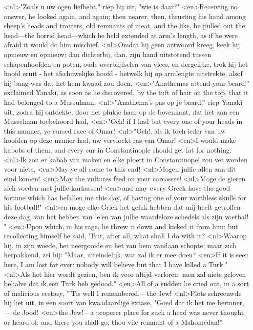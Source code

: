 <nl>"Zoals u uw ogen liefhebt," riep hij uit, "wie is daar?"
<en>Receiving no answer, he looked again, and again; then nearer, then, thrusting his hand among sheep's heads and trotters, old remnants of meat, and the like, he pulled out the head—the horrid head—which he held extended at arm's length, as if he were afraid it would do him mischief.
<nl>Omdat hij geen antwoord kreeg, keek hij opnieuw en opnieuw; dan dichterbij, dan, zijn hand uitstotend tussen schapenhoofden en poten, oude overblijfselen van vlees, en dergelijke, trok hij het hoofd eruit - het afschuwelijke hoofd - hetwelk hij op armlengte uitstrekte, alsof hij bang was dat het hem kwaad zou doen.
<en>"Anathemas attend your beard!" exclaimed Yanaki, as soon as he discovered, by the tuft of hair on the top, that it had belonged to a Mussulman, 
<nl>"Anathema's pas op je baard!" riep Yanaki uit, zodra hij ontdekte, door het plukje haar op de bovenkant, dat het aan een Musselman toebehoord had, 
<en>"Och! if I had but every one of your heads in this manner, ye cursed race of Omar!
<nl>"Och!, als ik toch ieder van uw hoofden op deze manier had, uw vervloekt ras van Omar!
<en>I would make kabobs of them, and every cur in Constantinople should get fat for nothing.
<nl>Ik zou er kabab van maken en elke ploert in Constantinopel zou  vet worden voor niets.
<en>May ye all come to this end!
<nl>Mogen jullie allen  aan dit eind komen!
<en>May the vultures feed on your carcasses!
<nl>Moge de gieren zich voeden met jullie karkassen!
<en>and may every Greek have the good fortune which has befallen me this day, of having one of your worthless skulls for his football!"
<nl>en moge elke Griek het geluk hebben dat mij heeft getroffen deze dag, van het hebben van 'e'en van jullie waardeloze schedels als zijn voetbal! "
<en>Upon which, in his rage, he threw it down and kicked it from him; but recollecting himself he said, "But, after all, what shall I do with it?
<nl>Waarop hij, in zijn woede, het neergooide en het van hem vandaan schopte; maar zich herpakkend, zei hij: "Maar, uiteindelijk,  wat  zal ik er mee doen?
<en>If it is seen here, I am lost for ever: nobody will believe but that I have killed a Turk."
<nl>Als het hier wordt gezien, ben ik voor altijd verloren: men  zal niets geloven behalve dat ik een Turk heb gedood."
<en>All of a sudden he cried out, in a sort of malicious ecstasy, "'Tis well I remembered,---the Jew!
<nl>Plots schreeuwde hij het uit, in een soort van kwaadaardige extase, "Goed dat ik het me herinner,--- de Jood!
<en>the Jew!—a properer place for such a head was never thought or heard of; and there you shall go, thou vile remnant of a Mahomedan!"
